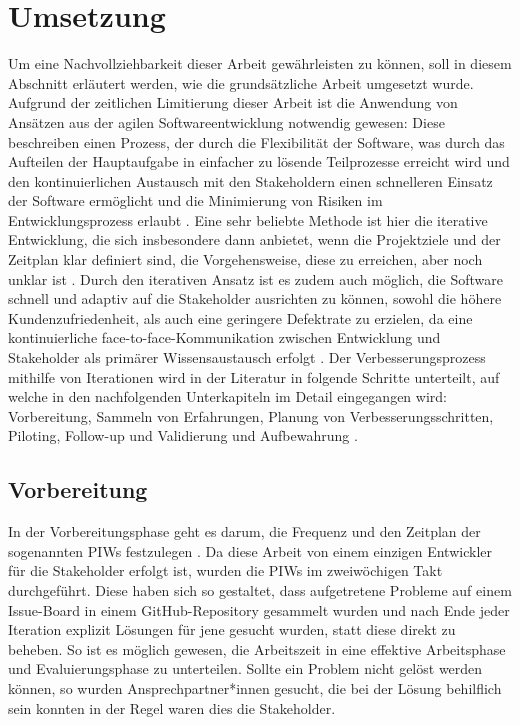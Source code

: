 \section{Umsetzung}
\label{sec:umsetzung}
Um eine Nachvollziehbarkeit dieser Arbeit gewährleisten zu können, soll in diesem Abschnitt erläutert werden, wie die grundsätzliche Arbeit umgesetzt wurde. \newline
Aufgrund der zeitlichen Limitierung dieser Arbeit ist die Anwendung von Ansätzen aus der agilen Softwareentwicklung notwendig gewesen: Diese beschreiben einen Prozess, der durch die Flexibilität der Software, was durch das Aufteilen der Hauptaufgabe in einfacher zu lösende Teilprozesse erreicht wird und den kontinuierlichen Austausch mit den Stakeholdern einen schnelleren Einsatz der Software ermöglicht und die Minimierung von Risiken im Entwicklungsprozess erlaubt \cite{Siepermann2018}. Eine sehr beliebte Methode ist hier die iterative Entwicklung, die sich insbesondere dann anbietet, wenn die Projektziele und der Zeitplan klar definiert sind, die Vorgehensweise, diese zu erreichen, aber noch unklar ist \cite{salo2007iterative}. Durch den iterativen Ansatz ist es zudem auch möglich, die Software schnell und adaptiv auf die Stakeholder ausrichten zu können, sowohl die höhere Kundenzufriedenheit, als auch eine geringere Defektrate zu erzielen, da eine kontinuierliche face-to-face-Kommunikation zwischen Entwicklung und Stakeholder als primärer Wissensaustausch erfolgt \cite{salo2007iterative}. Der Verbesserungsprozess mithilfe von Iterationen wird in der Literatur in folgende Schritte unterteilt, auf welche in den nachfolgenden Unterkapiteln im Detail eingegangen wird: Vorbereitung, Sammeln von Erfahrungen, Planung von Verbesserungsschritten, Piloting, Follow-up und Validierung und Aufbewahrung \cite{salo2007iterative}.

\subsection{Vorbereitung}
In der Vorbereitungsphase geht es darum, die Frequenz und den Zeitplan der sogenannten \ac{PIW}s festzulegen \cite{salo2007iterative}. Da diese Arbeit von einem einzigen Entwickler für die Stakeholder erfolgt ist, wurden die PIWs im zweiwöchigen Takt durchgeführt. Diese haben sich so gestaltet, dass aufgetretene Probleme auf einem Issue-Board in einem GitHub-Repository gesammelt wurden und nach Ende jeder Iteration explizit Lösungen für jene gesucht wurden, statt diese direkt zu beheben. So ist es möglich gewesen, die Arbeitszeit in eine effektive Arbeitsphase und Evaluierungsphase zu unterteilen. Sollte ein Problem nicht gelöst werden können, so wurden Ansprechpartner*innen gesucht, die bei der Lösung behilflich sein konnten \- in der Regel waren dies die Stakeholder.

